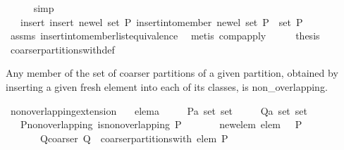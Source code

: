 \begin{isabellebody}
\ \ \ \ \isamarkupfalse%
\ simp\isanewline
\ \ \isamarkupfalse%
\ \isamarkupfalse%
\ {\isachardoublequoteopen}{\isasymdots}\ {\isacharequal}\ insert\ {\isacharparenleft}insert\ {\isacharbraceleft}new{\isacharunderscore}el{\isacharbraceright}\ {\isacharparenleft}set\ P{\isacharparenright}{\isacharparenright}\ {\isacharparenleft}{\isacharparenleft}insert{\isacharunderscore}into{\isacharunderscore}member\ new{\isacharunderscore}el\ {\isacharparenleft}set\ P{\isacharparenright}{\isacharparenright}\ {\isacharbackquote}\ set\ P{\isacharparenright}{\isachardoublequoteclose}\isanewline
\ \ \ \ \isamarkupfalse%
\ assms\ insert{\isacharunderscore}into{\isacharunderscore}member{\isacharunderscore}list{\isacharunderscore}equivalence\ \isamarkupfalse%
\ {\isacharparenleft}metis\ comp{\isacharunderscore}apply{\isacharparenright}\isanewline
\ \ \isamarkupfalse%
\ \isamarkupfalse%
\ {\isacharquery}thesis\ \isamarkupfalse%
\ coarser{\isacharunderscore}partitions{\isacharunderscore}with{\isacharunderscore}def\ \isacommand{{\isachardot}}\isamarkupfalse%
\isanewline
{}\isamarkupfalse%
%
\endisatagproof
{\isafoldproof}%
%
\isadelimproof
%
\endisadelimproof
%
\begin{isamarkuptext}%
Any member of the set of coarser partitions of a given partition, obtained by inserting 
  a given fresh element into each of its classes, is non_overlapping.%
\end{isamarkuptext}%
\isamarkuptrue%
\isamarkupfalse%
\ non{\isacharunderscore}overlapping{\isacharunderscore}extension{}{\isacharcolon}\isanewline
\ \ \ elem{\isacharcolon}{\isacharcolon}{\isacharprime}a\isanewline
\ \ \ \ \ P{\isacharcolon}{\isacharcolon}{\isachardoublequoteopen}{\isacharprime}a\ set\ set{\isachardoublequoteclose}\isanewline
\ \ \ \ \ Q{\isacharcolon}{\isacharcolon}{\isachardoublequoteopen}{\isacharprime}a\ set\ set{\isachardoublequoteclose}\isanewline
\ \ \ P{\isacharunderscore}non{\isacharunderscore}overlapping{\isacharcolon}\ {\isachardoublequoteopen}is{\isacharunderscore}non{\isacharunderscore}overlapping\ P{\isachardoublequoteclose}\isanewline
\ \ \ \ \ \ \ new{\isacharunderscore}elem{\isacharcolon}\ {\isachardoublequoteopen}elem\ {\isasymnotin}\ {\isasymUnion}\ P{\isachardoublequoteclose}\isanewline
\ \ \ \ \ \ \ Q{\isacharunderscore}coarser{\isacharcolon}\ {\isachardoublequoteopen}Q\ {\isasymin}\ coarser{\isacharunderscore}partitions{\isacharunderscore}with\ elem\ P{\isachardoublequoteclose}\isanewline

\end{isabellebody}
